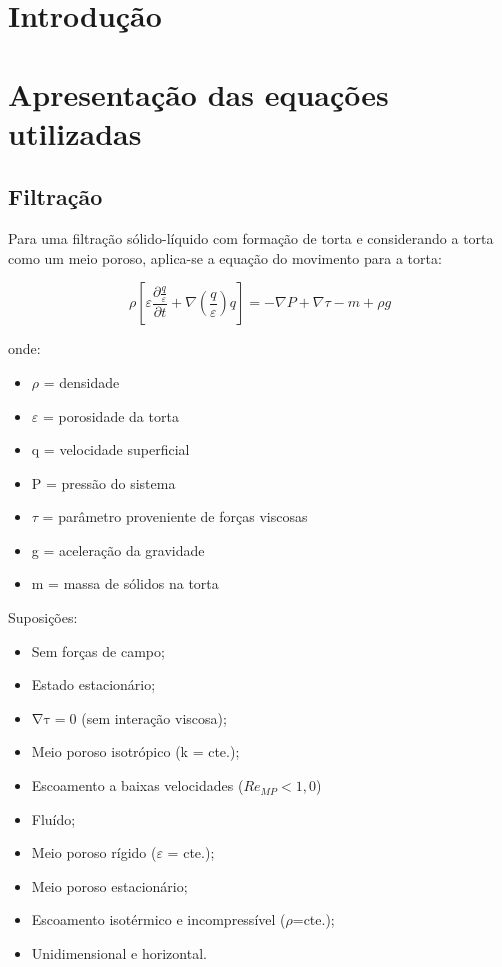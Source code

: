 \chapter{Introdução}



\chapter{Apresentação das equações utilizadas}

\section{Filtração}


Para uma filtração sólido-líquido com formação de torta e considerando a torta como um meio poroso, aplica-se a equação do movimento para a torta:


\begin{equation}\label{key}
\rho\left[\varepsilon \frac{\partial \frac{q}{\varepsilon}}{\partial t}+\nabla\left(\frac{q}{\varepsilon}\right) q\right]=-\nabla P+\nabla \tau-m+\rho g
\end{equation}


onde:

\begin{itemize}

\item $\rho$ = densidade
\item $\varepsilon$ = porosidade da torta
\item q = velocidade superficial
\item P = pressão do sistema
\item $\tau$ = parâmetro proveniente de forças viscosas
\item g = aceleração da gravidade
\item m = massa de sólidos na torta

\end{itemize}

Suposições:

\begin{itemize}
\item Sem forças de campo;
\item Estado estacionário;
\item $\mathrm{\nabla\tau}= 0$ (sem interação viscosa);
\item Meio poroso isotrópico (k = cte.);
\item Escoamento a baixas velocidades ($Re_{MP}<1,0$)
\item Fluído;
\item Meio poroso rígido ($\varepsilon$ = cte.);
\item Meio poroso estacionário;
\item Escoamento isotérmico e incompressível ($\rho$=cte.);
\item Unidimensional e horizontal.
\end{itemize}

